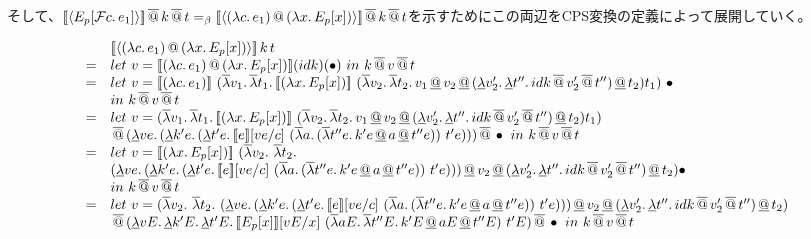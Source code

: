 \documentclass[japanese,draft]{jssst_ppl} %
\begin{document}
そして、$[\![{\langle{E_p[{\cal F}{c}.\,{e_1}]}\rangle}]\!]\,\overline{@}\, k \,\overline{@}\, t =_{\beta} [\![{\langle{{(\lambda{c}.\,{e_1})}\,@\,{(\lambda{x}.\,{E_p[x]})}}\rangle}]\!] \,\overline{@}\, k \,\overline{@}\, t$を示すためにこの両辺をCPS変換の定義によって展開していく。\\
\begin{figure}[h]
\[
\begin{array}{cl}
 & \CPSTh{\Prompt{\App{\LamP{c}{e_1}}{\LamP{x}{E_p[x]}}}}\,k\,t\\
 = & let\ v = \CPSTh{\App{\LamP{c}{e_1}}{\LamP{x}{E_p[x]}}}(idk)(\bullet)\ in\ 
  k\SAppS v \SAppS t\\
  = & let\ v = \CPSTh{\LamP{c}{e_1}}\ \SLamP{v_1}{
    \SLam{t_1}{\CPSTh{\LamP{x}{E_p[x]}}\ \SLamP{v_2}{
        \SLam{t_2}{\DApp{\DApp{\DApp{v_1}{v_2}}
                    {\DLamP{v_2'}{\DLam{t''}
                        {\SApp{\SApp{idk}{v_2'}}{t''}}}}}{t_2}}}}t_1} \ \bullet\ \\
  & in\ k\SAppS v \SAppS t\\
  = & let\ v = \SLamP{v_1}{
    \SLam{t_1}{\CPSTh{\LamP{x}{E_p[x]}}\ \SLamP{v_2}{
        \SLam{t_2}{\DApp{\DApp{\DApp{v_1}{v_2}}
                    {\DLamP{v_2'}{\DLam{t''}
                        {\SApp{\SApp{idk}{v_2'}}{t''}}}}}{t_2}}}}t_1} \\
  & \SAppS
  \DLamP{ve}{\DLamP{k'e}{\DLamP{t'e}{\CPSTh{e}[\Change{c}{ve}]\
        \SLamP{a}{\SLamP{t''e}{k'e \DAppS a \DAppS t''e}}\ t'e}}} \SAppS \bullet\ in\
  k\SAppS v \SAppS t\\

  = & let\ v = \CPSTh{\LamP{x}{E_p[x]}}\ (\SLamS v_2.\ 
  \SLamS t_2.\ \\
   & \DApp{\DApp{\DApp{\DLamP{ve}{\DLamP{k'e}{\DLamP{t'e}{\CPSTh{e}[\Change{c}{ve}]\
        \SLamP{a}{\SLamP{t''e}{k'e \DAppS a \DAppS t''e}}\ t'e}}}}{v_2}}
                    {\DLamP{v_2'}{\DLam{t''}
                        {\SApp{\SApp{idk}{v_2'}}{t''}}}}}{t_2})\bullet\\
  & in\ k\SAppS v \SAppS t\\

  = & let\ v = (\SLamS v_2.\ 
  \SLamS t_2.\ 
  \DApp{\DApp{\DApp{\DLamP{ve}{\DLamP{k'e}{\DLamP{t'e}{\CPSTh{e}[\Change{c}{ve}]\
        \SLamP{a}{\SLamP{t''e}{k'e \DAppS a \DAppS t''e}}\ t'e}}}}{v_2}}
                    {\DLamP{v_2'}{\DLam{t''}
                        {\SApp{\SApp{idk}{v_2'}}{t''}}}}}{t_2})\\
  & \SAppS \DLamP{vE}{\DLam{k'E}{\DLam{t'E}{\CPSTh{E_p[x]}[\Change{x}{vE}]\
  \SLamP{aE}{\SLam{t''E}{k'E \DAppS aE \DAppS t''E}}\ t'E}}} \SAppS \bullet \ in\
  k\SAppS v \SAppS t\\


\end{array}\]
\end{figure}
\end{document}
